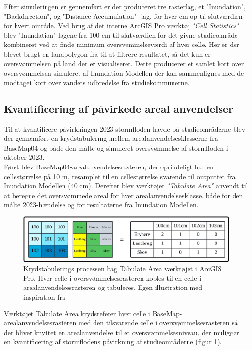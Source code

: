 Efter simuleringen er gennemført er der produceret tre rasterlag, et "Inundation", "Backdirection", og "Distance Accumulation" -lag, for hver cm op til slutværdien for hvert område. Ved brug af det interne ArcGIS Pro værktøj \textit{"Cell Statistics"} blev "Inundation" \hspace{0.2cm} lagene fra 100 cm til slutværdien for det givne studieområde kombineret ved at finde minimum oversvømmelseværdi af hver celle. Her er der blevet brugt en landpolygon fra \cite{klimadatastyrelsen_landpolygon} til at filtrere resultatet, så det kun er oversvømmelsen på land der er visualiseret. Dette producerer et samlet kort over oversvømmelsen simuleret af Inundation Modellen der kan sammenlignes med de modtaget kort over vandets udbredelse fra studiekommunerne. 

\subsection{Kvantificering af påvirkede areal anvendelser} \label{Afsnit: Udregning af påvirkede areal anvendelser}

Til at kvantificere påvirkningen 2023 stormfloden havde på studieområderne blev der gennemført en krydstabulering mellem arealanvendelsesklasserne fra BaseMap04 og både den målte og simuleret oversvømmelse af stormfloden i oktober 2023. \\

Først blev BaseMap04-arealanvendelsesrasteren, der oprindeligt har en cellestørrelse på 10 m, resamplet til en cellestørrelse svarende til outputtet fra Inundation Modellen (40 cm). Derefter blev værktøjet \textit{"Tabulate Area"} anvendt til at beregne det oversvømmede areal for hver arealanvendelsesklasse, både for den målte 2023-hændelse og for resultaterne fra Inundation Modellen. 
\begin{figure}[H]
    \centering
    \includegraphics[width=1\linewidth]{images/metode/tabulate.jpg}
    \caption{Krydstabulerings processen bag Tabulate Area værktøjet i ArcGIS Pro. Hver celle i oversvømmelsesrasteren kobles til en celle i arealanvendelsesrasteren og tabuleres. Egen illustration med inspiration fra \cite{esri_tabulate_nodate}}
    \label{Figur: Tabulate}
\end{figure}
Værktøjet Tabulate Area krydsreferer hver celle i BaseMap-arealanvendelsesrasteren med den tilsvarende celle i oversvømmelsesrasteren så der bliver knyttet en arealanvendelse til et oversvømmelsesniveau, der muliggør en kvantificering af stormflodens påvirkning af studieområderne (figur \ref{Figur: Tabulate}). \\

